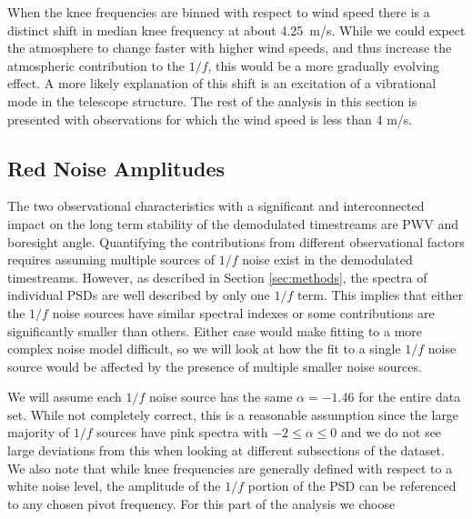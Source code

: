 \documentclass[twocolumn, tighten, numberedappendix, twocolappendix]{aastex63}
\begin{document}

When the knee frequencies are binned with respect to wind speed there is a distinct shift in median knee frequency at about 4.25~m/s. While we could expect the atmosphere to change faster with higher wind speeds, and thus increase the atmospheric contribution to the $1/f$, this would be a more gradually evolving effect. A more likely explanation of this shift is an excitation of a vibrational mode in the telescope structure. The rest of the analysis in this section is presented with observations for which the wind speed is less than 4 m/s.

\subsection{Red Noise Amplitudes}
The two observational characteristics with a significant and interconnected impact on the long term stability of the demodulated timestreams are PWV and boresight angle. Quantifying the contributions from different observational factors requires assuming multiple sources of $1/f$ noise exist in the demodulated timestreams. However, as described in Section \ref{sec:methods}, the spectra of individual PSDs are well described by only one $1/f$ term. This implies that either the $1/f$ noise sources have similar spectral indexes or some contributions are significantly smaller than others. Either case would make fitting to a more complex noise model difficult, so we will look at how the fit to a single $1/f$ noise source would be affected by the presence of multiple smaller noise sources. 

We will assume each $1/f$ noise source has the same $\alpha=-1.46$ for the entire data set. While not completely correct, this is a reasonable assumption since the large majority of $1/f$ sources have pink spectra with $-2 \leq \alpha \leq 0$ and we do not see large deviations from this when looking at different subsections of the dataset. We also note that while knee frequencies are generally defined with respect to a white noise level, the amplitude of the $1/f$ portion of the PSD can be referenced to any chosen pivot frequency. For this part of the analysis we choose
\end{document}
